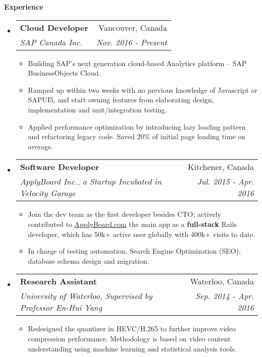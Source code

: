 \documentclass[letterpaper,10pt]{article}
\makeatletter
\newcommand{\resitem}[1]{\item #1 \vspace{-2pt}}
\newcommand{\resheading}[1]{{\large \colorbox{mygrey}{\begin{minipage}{\textwidth}{\textbf{#1 \vphantom{p\^{E}}}}\end{minipage}}}}
\newcommand{\ressubheading}[4]{
\begin{tabular*}{7.0in}{l@{\extracolsep{\fill}}r}
		\textbf{#1} & #2 \\
		\textit{#3} & \textit{#4} \\
\end{tabular*}\vspace{-6pt}}
\makeatother
\begin{document}
\resheading{Experience}
\begin{itemize}
\itemsep0em
\item
    \ressubheading{Cloud Developer}{Vancouver, Canada}{SAP Canada Inc.}{ Nov. 2016 - Present}
	\begin{itemize}
        \resitem{Building SAP's next generation cloud-based Analytics platform -- SAP BusinessObjects Cloud.}
        \resitem{Ramped up within two weeks with no previous knowledge of Javascript or SAPUI5, and start owning features from elaborating design, implementation and unit/integration testing.}
        \resitem{Applied performance optimization by introducing lazy loading pattern and refactoring legacy code. Saved 20\% of initial page loading time on average.} 
	\end{itemize}
\item
    \ressubheading{Software Developer}{Kitchener, Canada}{ApplyBoard Inc., a Startup Incubated in Velocity Garage}{ Jul. 2015 - Apr. 2016}
	\begin{itemize}
        \resitem{Join the dev team as the first developer besides CTO; actively contributed to \href{https://www.applyboard.com/student}{ApplyBoard.com} the main app as a \textbf{full-stack} Rails developer, which has 50k+ active user globally with 400k+ visits to date.}
		\resitem{In charge of testing automation, Search Engine Optimization (SEO), database schema design and migration.}
	\end{itemize}
\item
	\ressubheading{Research Assistant}{Waterloo, Canada}{University of Waterloo, Supervised by Professor En-Hui Yang}{Sep. 2014 - Apr. 2016}
	\begin{itemize}
		\resitem{Redesigned the quantizer in HEVC/H.265 to further improve video compression performance. Methodology is based on video content understanding using machine learning and statistical analysis tools.}
	\end{itemize}
\end{itemize}
\end{document}
